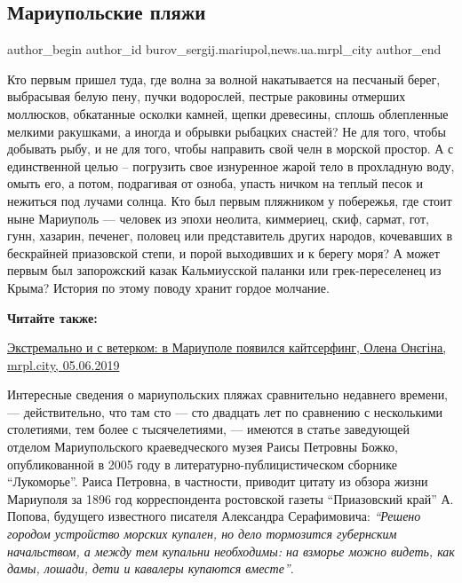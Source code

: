  
 
 
 
 
 
\subsection{Мариупольские пляжи}
\label{sec:08_06_2019.stz.news.ua.mrpl_city.1.mariupolskie_pljazhi}
 
\ifcmt
 author_begin
   author_id burov_sergij.mariupol,news.ua.mrpl_city
 author_end
\fi


Кто первым пришел туда, где волна за волной накатывается на песчаный берег,
выбрасывая белую пену, пучки водорослей, пестрые раковины отмерших моллюсков,
обкатанные осколки камней, щепки древесины, сплошь облепленные мелкими
ракушками, а иногда и обрывки рыбацких снастей? Не для того, чтобы добывать
рыбу, и не для того, чтобы направить свой челн в морской простор. А с
единственной целью – погрузить свое изнуренное жарой тело в прохладную воду,
омыть его, а потом, подрагивая от озноба, упасть ничком на теплый песок и
нежиться под лучами солнца. Кто был первым пляжником у побережья, где стоит
ныне Мариуполь — человек из эпохи неолита, киммериец, скиф, сармат, гот, гунн,
хазарин, печенег, половец или представитель других народов, кочевавших в
бескрайней приазовской степи, и порой выходивших и к берегу моря? А может
первым был запорожский казак Кальмиусской паланки или грек-переселенец из
Крыма? История по этому поводу хранит гордое молчание.

\textbf{Читайте также:} 

\href{https://mrpl.city/news/view/e-kstremalno-i-s-veterkom-v-mariupole-poyavilsya-kajtserfing-foto}{%
Экстремально и с ветерком: в Мариуполе появился кайтсерфинг, Олена Онєгіна, mrpl.city, 05.06.2019}

Интересные сведения о мариупольских пляжах сравнительно недавнего времени, —
действительно, что там сто — сто двадцать лет по сравнению с несколькими
столетиями, тем более с тысячелетиями, — имеются в статье заведующей отделом
Мариупольского краеведческого музея Раисы Петровны Божко, опубликованной в 2005
году в литературно-публицистическом сборнике \enquote{Лукоморье}. Раиса Петровна, в
частности, приводит цитату из обзора жизни Мариуполя за 1896 год корреспондента
ростовской газеты \enquote{Приазовский край} А. Попова, будущего известного писателя
Александра Серафимовича: \emph{\enquote{Решено городом устройство морских купален, но дело
тормозится губернским начальством, а между тем купальни необходимы: на взморье
можно видеть, как дамы, лошади, дети и кавалеры купаются вместе}}.

